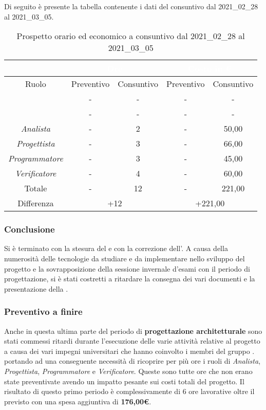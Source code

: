 Di seguito è presente la tabella contenente i dati del consuntivo dal 2021\_02\_28 al 2021\_03\_05.
\begin{table}[H]
	\centering
	\begin{tabular}{|c|c|c|c|c|}
		\rowcolor{darkblue} 
		&\multicolumn{2}{c|}{\textcolor{white}{Ore}}&\multicolumn{2}{c|}{\textcolor{white}{Costo in €}}\\ \hline
		Ruolo			&	Preventivo				&	Consuntivo		&	Preventivo	&	Consuntivo\\ \hline
		{\Responsabile}		&	-					&	-				&	-			&	- \\ \hline
		{\Amministratore}	&	-					&	-				&	-			&	- \\ \hline
		\textit{Analista}	&	-					&	2				&	-			&	50,00 \\ \hline
		\textit{Progettista}& 	-					&   3 				& 	-			&  	66,00 \\ \hline
		\textit{Programmatore}& -					& 	3				& 	-			&  	45,00 \\ \hline
		\textit{Verificatore}&	-					&	4				&	-			&	60,00 \\ \hline
		Totale				&	-					&	12				&	-			&	221,00 \\ \hline
		Differenza			& 	\multicolumn{2}{c|}{+12} 				&\multicolumn{2}{c|}{+221,00}\\ \hline
	\end{tabular}
	\caption{Prospetto orario ed economico a consuntivo dal 2021\_02\_28 al 2021\_03\_05}
\end{table}
\subsubsection{Conclusione}
Si è terminato con la stesura del  e con la correzione dell'\AdR{}. A causa della numerosità delle tecnologie da studiare e da implementare nello sviluppo del progetto e la sovrapposizione della sessione invernale d'esami con il periodo di progettazione, si è stati costretti a ritardare la consegna dei vari documenti e la presentazione della .
\subsubsection{Preventivo a finire}
Anche in questa ultima parte del periodo di \textbf{progettazione architetturale} sono stati commessi ritardi durante l'esecuzione delle varie attività relative al progetto a causa dei vari impegni universitari che hanno coinvolto i membri del gruppo {\Gruppo}. portando ad una conseguente necessità di ricoprire per più ore i ruoli di \textit{Analista}, \textit{Progettista}, \textit{Programmatore} e \textit{Verificatore}. Queste sono tutte ore che non erano state preventivate avendo un impatto pesante sui costi totali del progetto.
Il risultato di questo primo periodo è complessivamente di 6 ore lavorative oltre il previsto con una spesa aggiuntiva di \textbf{176,00€}.